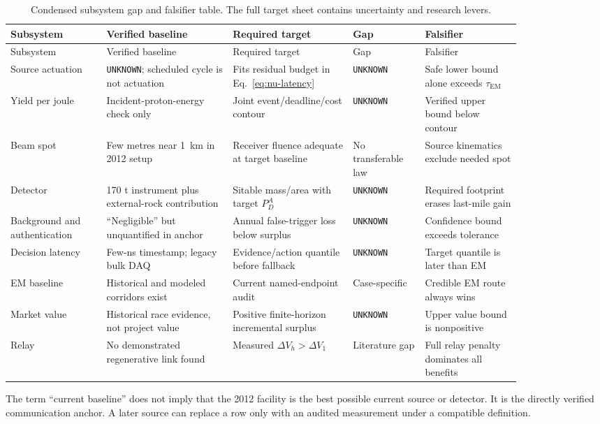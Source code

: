 \documentclass[11pt]{article}
\newcommand{\unknown}{\texttt{UNKNOWN}}
\begin{document}
\begingroup
\footnotesize
\setlength{\tabcolsep}{2pt}
\begin{longtable}{L{0.16\linewidth}L{0.21\linewidth}L{0.20\linewidth}L{0.12\linewidth}L{0.16\linewidth}}
\caption{Condensed subsystem gap and falsifier table. The full target sheet contains uncertainty and research levers.}\label{tab:gaps}\\
\toprule
Subsystem & Verified baseline & Required target & Gap & Falsifier \\
\midrule
\endfirsthead
\toprule
Subsystem & Verified baseline & Required target & Gap & Falsifier \\
\midrule
\endhead
Source actuation & \unknown; scheduled cycle is not actuation & Fits residual budget in Eq.~\eqref{eq:nu-latency} & \unknown & Safe lower bound alone exceeds $\tau_{\mathrm{EM}}$ \\
Yield per joule & Incident-proton-energy check only & Joint event/deadline/cost contour & \unknown & Verified upper bound below contour \\
Beam spot & Few metres near \SI{1}{\kilo\metre} in 2012 setup & Receiver fluence adequate at target baseline & No transferable law & Source kinematics exclude needed spot \\
Detector & 170 t instrument plus external-rock contribution & Sitable mass/area with target $P_D^{A}$ & \unknown & Required footprint erases last-mile gain \\
Background and authentication & ``Negligible'' but unquantified in anchor & Annual false-trigger loss below surplus & \unknown & Confidence bound exceeds tolerance \\
Decision latency & Few-ns timestamp; legacy bulk DAQ & Evidence/action quantile before fallback & \unknown & Target quantile is later than EM \\
EM baseline & Historical and modeled corridors exist & Current named-endpoint audit & Case-specific & Credible EM route always wins \\
Market value & Historical race evidence, not project value & Positive finite-horizon incremental surplus & \unknown & Upper value bound is nonpositive \\
Relay & No demonstrated regenerative link found & Measured $\Delta V_h>\Delta V_1$ & Literature gap & Full relay penalty dominates all benefits \\
\bottomrule
\end{longtable}
\endgroup

The term ``current baseline'' does not imply that the 2012 facility is the best possible current source or detector. It is the directly verified communication anchor. A later source can replace a row only with an audited measurement under a compatible definition.
\end{document}
